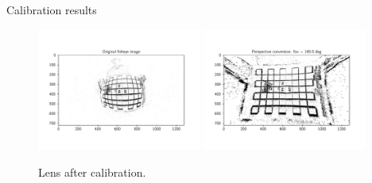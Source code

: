 \documentclass{beamer}
\begin{document}
   
    

\begin{frame}{Calibration results}
    \begin{figure}
        \centering
        \includegraphics[width=0.48\textwidth]{./fig/pgfplot/build/ent_before.pdf}
        \includegraphics[width=0.48\textwidth]{./fig/pgfplot/build/ent_after.pdf}
        \caption{Lens after calibration.}
        \label{fig:calib_after}
    \end{figure}
\end{frame}
\end{document}
